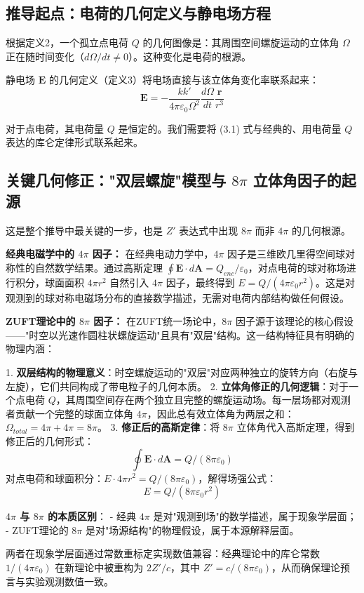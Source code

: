 \documentclass[a4paper,12pt]{article}
\theoremstyle{plain}
\renewcommand{\vec}[1]{\bm{#1}}
\begin{document}
\subsection{推导起点：电荷的几何定义与静电场方程}
根据定义2，一个孤立点电荷 $Q$ 的几何图像是：其周围空间螺旋运动的立体角 $\Omega$ 正在随时间变化（$d\Omega/dt \neq 0$）。这种变化是电荷的根源。

静电场 $\vec{E}$ 的几何定义（定义3）将电场直接与该立体角变化率联系起来：
$$\vec{E} = -\frac{k k'}{4\pi\varepsilon_0 \Omega^2} \frac{d\Omega}{dt} \frac{\vec{r}}{r^3} \tag{3.1}$$ 

对于点电荷，其电荷量 $Q$ 是恒定的。我们需要将 (3.1) 式与经典的、用电荷量 $Q$ 表达的库仑定律形式联系起来。

\subsection{关键几何修正："双层螺旋"模型与 $8\pi$ 立体角因子的起源}
这是整个推导中最关键的一步，也是 $Z'$ 表达式中出现 $8\pi$ 而非 $4\pi$ 的几何根源。

\textbf{经典电磁学中的 $4\pi$ 因子：}
在经典电动力学中，$4\pi$ 因子是三维欧几里得空间球对称性的自然数学结果。通过高斯定理 $\oint \vec{E} \cdot d\vec{A} = Q_{enc}/\varepsilon_0$，对点电荷的球对称场进行积分，球面面积 $4\pi r^2$ 自然引入 $4\pi$ 因子，最终得到 $E = Q/(4\pi\varepsilon_0 r^2)$。这是对观测到的球对称电磁场分布的直接数学描述，无需对电荷内部结构做任何假设。

\textbf{ZUFT理论中的 $8\pi$ 因子：}
在ZUFT统一场论中，$8\pi$ 因子源于该理论的核心假设——"时空以光速作圆柱状螺旋运动"且具有"双层"结构。这一结构特征具有明确的物理内涵：

1. \textbf{双层结构的物理意义}：时空螺旋运动的"双层"对应两种独立的旋转方向（右旋与左旋），它们共同构成了带电粒子的几何本质。
2. \textbf{立体角修正的几何逻辑}：对于一个点电荷 $Q$，其周围空间存在两个独立且完整的螺旋运动场。每一层场都对观测者贡献一个完整的球面立体角 $4\pi$，因此总有效立体角为两层之和：$\Omega_{total} = 4\pi + 4\pi = 8\pi$。
3. \textbf{修正后的高斯定律}：将 $8\pi$ 立体角代入高斯定理，得到修正后的几何形式：
   $$\oint \vec{E} \cdot d\vec{A} = Q / (8\pi\varepsilon_0) \tag{3.2}$$
   对点电荷和球面积分：$E \cdot 4\pi r^2 = Q / (8\pi\varepsilon_0)$，解得场强公式：
   $$E = Q / (8\pi\varepsilon_0 r^2) \tag{3.3}$$

\textbf{$4\pi$ 与 $8\pi$ 的本质区别}：
- 经典 $4\pi$ 是对"观测到场"的数学描述，属于现象学层面；
- ZUFT理论的 $8\pi$ 是对"场源结构"的物理假设，属于本源解释层面。

两者在现象学层面通过常数重标定实现数值兼容：经典理论中的库仑常数 $1/(4\pi\varepsilon_0)$ 在新理论中被重构为 $2Z'/c$，其中 $Z' = c/(8\pi\varepsilon_0)$，从而确保理论预言与实验观测数值一致。
\end{document}
